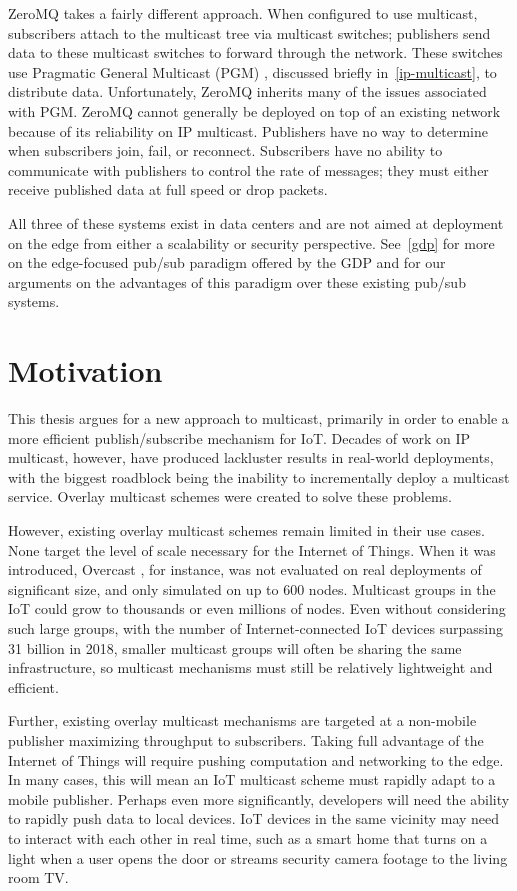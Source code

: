 ZeroMQ \cite{zeromq} takes a fairly different approach. When configured to use multicast, subscribers attach to the multicast tree via multicast switches; publishers send data to these multicast switches to forward through the network. These switches use Pragmatic General Multicast (PGM) \cite{RFC3208}, discussed briefly in~\autoref{ip-multicast}, to distribute data. Unfortunately, ZeroMQ inherits many of the issues associated with PGM. ZeroMQ cannot generally be deployed on top of an existing network because of its reliability on IP multicast. Publishers have no way to determine when subscribers join, fail, or reconnect. Subscribers have no ability to communicate with publishers to control the rate of messages; they must either receive published data at full speed or drop packets.

All three of these systems exist in data centers and are not aimed at deployment on the edge from either a scalability or security perspective. See~\autoref{gdp} for more on the edge-focused pub/sub paradigm offered by the GDP and for our arguments on the advantages of this paradigm over these existing pub/sub systems.

\section{Motivation}
\label{motivation}
This thesis argues for a new approach to multicast, primarily in order to enable a more efficient publish/subscribe mechanism for IoT. Decades of work on IP multicast, however, have produced lackluster results in real-world deployments, with the biggest roadblock being the inability to incrementally deploy a multicast service. Overlay multicast schemes were created to solve these problems.

However, existing overlay multicast schemes remain limited in their use cases. None target the level of scale necessary for the Internet of Things. When it was introduced, Overcast \cite{overcast}, for instance, was not evaluated on real deployments of significant size, and only simulated on up to 600 nodes. Multicast groups in the IoT could grow to thousands or even millions of nodes. Even without considering such large groups, with the number of Internet-connected IoT devices surpassing 31 billion \cite{ihs} in 2018, smaller multicast groups will often be sharing the same infrastructure, so multicast mechanisms must still be relatively lightweight and efficient.

Further, existing overlay multicast mechanisms are targeted at a non-mobile publisher maximizing throughput to subscribers. Taking full advantage of the Internet of Things will require pushing computation and networking to the edge. In many cases, this will mean an IoT multicast scheme must rapidly adapt to a mobile publisher. Perhaps even more significantly, developers will need the ability to rapidly push data to local devices. IoT devices in the same vicinity may need to interact with each other in real time, such as a smart home that turns on a light when a user opens the door or streams security camera footage to the living room TV. 

